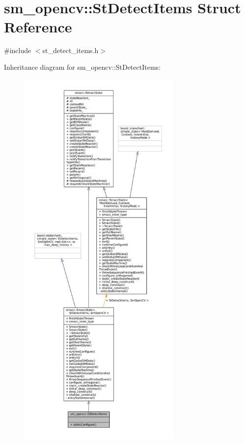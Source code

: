 \hypertarget{structsm__opencv_1_1StDetectItems}{}\section{sm\+\_\+opencv\+:\+:St\+Detect\+Items Struct Reference}
\label{structsm__opencv_1_1StDetectItems}


{\ttfamily \#include $<$st\+\_\+detect\+\_\+items.\+h$>$}



Inheritance diagram for sm\+\_\+opencv\+:\+:St\+Detect\+Items\+:
\nopagebreak
\begin{figure}[H]
\begin{center}
\leavevmode
\includegraphics[height=550pt]{structsm__opencv_1_1StDetectItems__inherit__graph}
\end{center}
\end{figure}


